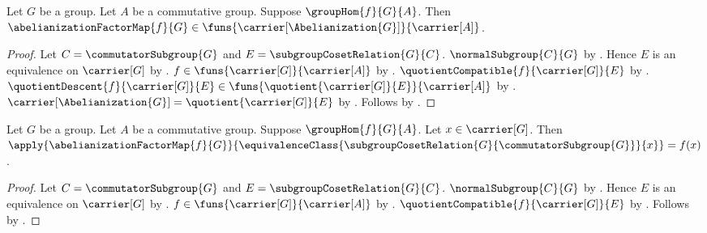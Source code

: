 \begin{proposition}\label{abelianization_factor_type}
    Let $G$ be a group.
    Let $A$ be a commutative group.
    Suppose $\groupHom{f}{G}{A}$.
    Then $\abelianizationFactorMap{f}{G}\in
        \funs{\carrier[\Abelianization{G}]}{\carrier[A]}$.
\end{proposition}
\begin{proof}
    Let $C=\commutatorSubgroup{G}$ and
        $E=\subgroupCosetRelation{G}{C}$.
    $\normalSubgroup{C}{G}$ by .
    Hence $E$ is an equivalence on $\carrier[G]$ by
        .
    $f\in\funs{\carrier[G]}{\carrier[A]}$ by
        .
    $\quotientCompatible{f}{\carrier[G]}{E}$ by
        .
    $\quotientDescent{f}{\carrier[G]}{E}\in
        \funs{\quotient{\carrier[G]}{E}}{\carrier[A]}$ by
        .
    $\carrier[\Abelianization{G}]=\quotient{\carrier[G]}{E}$ by
        .
    Follows by .
\end{proof}

\begin{proposition}\label{abelianization_factor_apply}
    Let $G$ be a group.
    Let $A$ be a commutative group.
    Suppose $\groupHom{f}{G}{A}$.
    Let $x\in\carrier[G]$.
    Then
        $\apply{\abelianizationFactorMap{f}{G}}
            {\equivalenceClass
                {\subgroupCosetRelation{G}{\commutatorSubgroup{G}}}{x}}
            =f(x)$.
\end{proposition}
\begin{proof}
    Let $C=\commutatorSubgroup{G}$ and
        $E=\subgroupCosetRelation{G}{C}$.
    $\normalSubgroup{C}{G}$ by .
    Hence $E$ is an equivalence on $\carrier[G]$ by
        .
    $f\in\funs{\carrier[G]}{\carrier[A]}$ by
        .
    $\quotientCompatible{f}{\carrier[G]}{E}$ by
        .
    Follows by
        .
\end{proof}

